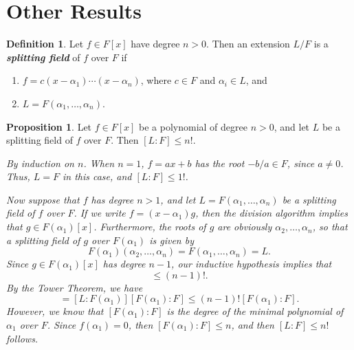 \documentclass[leqno]{article}
\makeatletter
\theoremstyle{definition}
\newtheorem{prop}{Proposition}
\newtheorem{definition}{Definition}
\theoremstyle{remark}
\let\oldproofname=\proofname
\renewcommand{\proofname}{\textit{\oldproofname}}
\theoremstyle{definition}
\renewenvironment{proof}[1][\proofname]{\par
  \pushQED{\qed}%
  \normalfont \topsep6\p@\@plus6\p@\relax
  \list{}{\leftmargin=0mm
          \rightmargin=0mm
          \settowidth{\itemindent}{\itshape#1}%
          \labelwidth=\itemindent
          \parsep=0pt \listparindent=0mm%
  }
  \item[\hskip\labelsep
        \itshape
    #1\@addpunct{.}]\ignorespaces
}{%
  \popQED\endlist\@endpefalse
}
\makeatother
\begin{document}
\section{Other Results}
    \begin{definition}\label{def:1}
        Let $f\in F[x]$ have degree $n>0$. Then an extension $L/F$ is a \textbf{\textit{splitting field}} of $f$ over $F$ if
            \begin{enumerate}
                \item $f=c(x-\alpha_1)\cdots(x-\alpha_n)$, where $c\in F$ and $\alpha_i\in L$, and
                \item $L=F(\alpha_1,\dots,\alpha_n)$.
            \end{enumerate}
    \end{definition}
    \begin{prop}\label{prop:1}
        Let $f\in F[x]$ be a polynomial of degree $n>0$, and let $L$ be a splitting field of $f$ over $F$. Then $[L\colon F]\leq n!$.
    \end{prop}
        \begin{proof}
            \emph{By induction on $n$. When $n=1$, $f=ax+b$ has the root $-b/a\in F$, since $a\neq 0$. Thus, $L=F$ in this case, and $[L\colon F]\leq 1!$.}\par\hspace{4mm}\emph{Now suppose that $f$ has degree $n>1$, and let $L=F(\alpha_1,\dots, \alpha_n)$ be a splitting field of $f$ over $F$. If we write $f=(x-\alpha_1)g$, then the division algorithm implies that $g\in F(\alpha_1)[x]$. Furthermore, the roots of $g$ are obviously $\alpha_2,\dots,\alpha_n$, so that a splitting field of $g$ over $F(\alpha_1)$ is given by}
                \begin{equation*}
                    F(\alpha_1)(\alpha_2,\dots,\alpha_n)=F(\alpha_1,\dots,\alpha_n)=L.
                \end{equation*}
            \emph{Since $g\in F(\alpha_1)[x]$ has degree $n-1$, our inductive hypothesis implies that}
                \begin{equation*}
                    [L\colon F(\alpha_1)]\leq (n-1)!.
                \end{equation*}
            \emph{By the Tower Theorem, we have}
                \begin{equation*}
                    [L\colon F]=[L\colon F(\alpha_1)][F(\alpha_1)\colon F]\leq (n-1)![F(\alpha_1)\colon F].
                \end{equation*}
            \emph{However, we know that $[F(\alpha_1)\colon F]$ is the degree of the minimal polynomial of $\alpha_1$ over $F$. Since $f(\alpha_1)=0$, then $[F(\alpha_1)\colon F]\leq n$, and then $[L\colon F]\leq n!$ follows.} 
        \end{proof}
\end{document}
